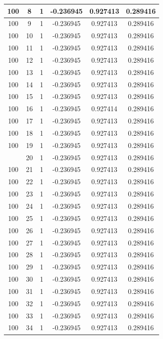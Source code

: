 \documentclass[12pt,a4paper]{article}
\numberwithin{equation}{section}
\numberwithin{figure}{section}
\numberwithin{table}{section}
\begin{document}
\begin{longtable}{|c|c|c|c|c|c|}
100 & 8 & 1 & -0.236945 & 0.927413 & 0.289416 \\ \hline
100 & 9 & 1 & -0.236945 & 0.927413 & 0.289416 \\ \hline
100 & 10 & 1 & -0.236945 & 0.927413 & 0.289416 \\ \hline
100 & 11 & 1 & -0.236945 & 0.927413 & 0.289416 \\ \hline
100 & 12 & 1 & -0.236945 & 0.927413 & 0.289416 \\ \hline
100 & 13 & 1 & -0.236945 & 0.927413 & 0.289416 \\ \hline
100 & 14 & 1 & -0.236945 & 0.927413 & 0.289416 \\ \hline
100 & 15 & 1 & -0.236945 & 0.927413 & 0.289416 \\ \hline
100 & 16 & 1 & -0.236945 & 0.927414 & 0.289416 \\ \hline
100 & 17 & 1 & -0.236945 & 0.927413 & 0.289416 \\ \hline
100 & 18 & 1 & -0.236945 & 0.927413 & 0.289416 \\ \hline
100 & 19 & 1 & -0.236945 & 0.927413 & 0.289416 \\ \hline
\pagebreak
100 & 20 & 1 & -0.236945 & 0.927413 & 0.289416 \\ \hline
100 & 21 & 1 & -0.236945 & 0.927413 & 0.289416 \\ \hline
100 & 22 & 1 & -0.236945 & 0.927413 & 0.289416 \\ \hline
100 & 23 & 1 & -0.236945 & 0.927413 & 0.289416 \\ \hline
100 & 24 & 1 & -0.236945 & 0.927413 & 0.289416 \\ \hline
100 & 25 & 1 & -0.236945 & 0.927413 & 0.289416 \\ \hline
100 & 26 & 1 & -0.236945 & 0.927413 & 0.289416 \\ \hline
100 & 27 & 1 & -0.236945 & 0.927413 & 0.289416 \\ \hline
100 & 28 & 1 & -0.236945 & 0.927413 & 0.289416 \\ \hline
100 & 29 & 1 & -0.236945 & 0.927413 & 0.289416 \\ \hline
100 & 30 & 1 & -0.236945 & 0.927413 & 0.289416 \\ \hline
100 & 31 & 1 & -0.236945 & 0.927413 & 0.289416 \\ \hline
100 & 32 & 1 & -0.236945 & 0.927413 & 0.289416 \\ \hline
100 & 33 & 1 & -0.236945 & 0.927413 & 0.289416 \\ \hline
100 & 34 & 1 & -0.236945 & 0.927413 & 0.289416 \\ \hline

\end{longtable}
\end{document}
